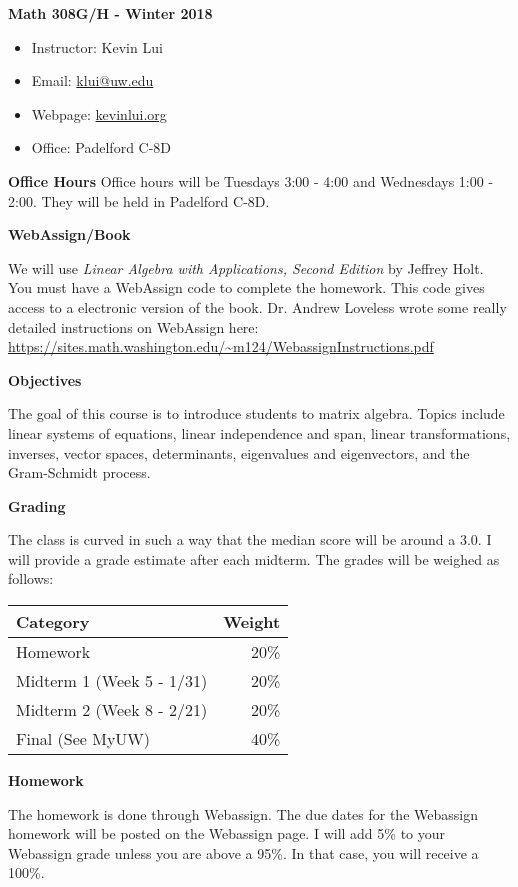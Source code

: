 \documentclass{article}
\begin{document}
\textbf{\huge  Math 308G/H - Winter 2018}
\begin{itemize}
    \item
        Instructor: Kevin Lui
    \item
        Email: \href{mailto:klui@uw.edu}{klui@uw.edu}
    \item
        Webpage: \url{kevinlui.org}
    \item
        Office: Padelford C-8D
\end{itemize}

\textbf{Office Hours}
Office hours will be Tuesdays 3:00 - 4:00 and Wednesdays 1:00 - 2:00. They will
be held in Padelford C-8D.

\textbf{WebAssign/Book}

We will use \textit{Linear Algebra with Applications, Second Edition} by
Jeffrey Holt. You must have a WebAssign code to complete the homework. This
code gives access to a electronic version of the book. Dr. Andrew Loveless
wrote some really detailed instructions on WebAssign here:
\url{https://sites.math.washington.edu/~m124/WebassignInstructions.pdf}

\textbf{Objectives}

The goal of this course is to introduce students to matrix algebra. Topics
include linear systems of equations, linear independence and span, linear
transformations, inverses, vector spaces, determinants, eigenvalues and
eigenvectors, and the Gram-Schmidt process.

\textbf{Grading}

The class is curved in such a way that the median score will be around a 3.0. I
will provide a grade estimate after each midterm.  The grades will be weighed
as follows:

\begin{tabular}{ l r }
    Category  & Weight   \\
    \hline
    Homework  & 20\%      \\
    Midterm 1 (Week 5 - 1/31) & 20\%      \\
    Midterm 2 (Week 8 - 2/21) & 20\%      \\
    Final (See MyUW)    & 40\%
\end{tabular}

\textbf{Homework}

The homework is done through Webassign. The due dates for the Webassign
homework will be posted on the Webassign page. I will add 5\% to your
Webassign grade unless you are above a 95\%. In that case, you will receive a
100\%.
\end{document}

